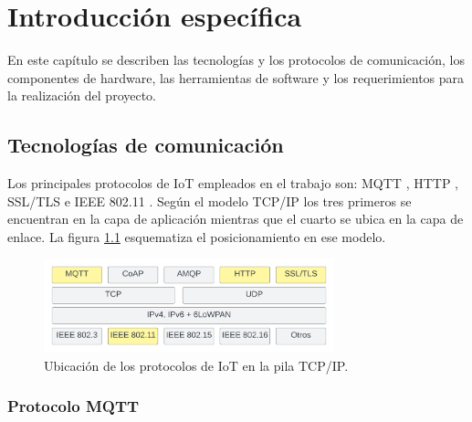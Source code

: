 \chapter{Introducción específica} %

\label{Chapter2}

En este capítulo se describen las tecnologías y los protocolos de comunicación, los componentes de hardware, las herramientas de software y los requerimientos para la realización del proyecto.

\section{Tecnologías de comunicación}
\label{sec:Tecnologías de comunicación}
Los principales protocolos de IoT empleados en el trabajo son: MQTT \citep{mqtt}, HTTP \citep{rfc1057}, SSL/TLS \citep{tls:1} e IEEE 802.11 \citep{802.11}. 
Según el modelo TCP/IP \citep{rfc1180} los tres primeros se encuentran en la capa de aplicación mientras que el cuarto se ubica en la capa de enlace. La figura \ref{fig:IotProtocols} esquematiza el posicionamiento en ese  modelo.


\begin{figure}[h]
	\centering
	\includegraphics[width=0.75\textwidth]{./Figures/protocols.jpeg}
	\caption[Ubicación de los protocolos de IoT en la pila TCP/IP]{Ubicación de los protocolos de IoT en la pila TCP/IP\protect\footnotemark.}
	\label{fig:IotProtocols}

\end{figure}



\subsection{Protocolo MQTT}
\label{sec:Protocolo MQTT}

